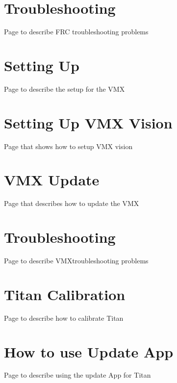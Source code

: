 \documentclass[letterpaper,10pt,english]{sphinxmanual}
\begin{document}
\chapter{Troubleshooting}
\label{\detokenize{docs/FRCTraining/troubleshooting:troubleshooting}}\label{\detokenize{docs/FRCTraining/troubleshooting::doc}}
Page to describe FRC troubleshooting problems


\chapter{Setting Up}
\label{\detokenize{docs/VMX/setup:setting-up}}\label{\detokenize{docs/VMX/setup::doc}}
Page to describe the set\sphinxhyphen{}up for the VMX


\chapter{Setting Up VMX Vision}
\label{\detokenize{docs/VMX/vision:setting-up-vmx-vision}}\label{\detokenize{docs/VMX/vision::doc}}
Page that shows how to setup VMX vision


\chapter{VMX Update}
\label{\detokenize{docs/VMX/update:vmx-update}}\label{\detokenize{docs/VMX/update::doc}}
Page that describes how to update the VMX


\chapter{Troubleshooting}
\label{\detokenize{docs/VMX/troubleshooting:troubleshooting}}\label{\detokenize{docs/VMX/troubleshooting::doc}}
Page to describe VMXtroubleshooting problems


\chapter{Titan Calibration}
\label{\detokenize{docs/Titan/calibration:titan-calibration}}\label{\detokenize{docs/Titan/calibration::doc}}
Page to describe how to calibrate Titan


\chapter{How to use Update App}
\label{\detokenize{docs/Titan/update:how-to-use-update-app}}\label{\detokenize{docs/Titan/update::doc}}
Page to describe using the update App for Titan
\end{document}
